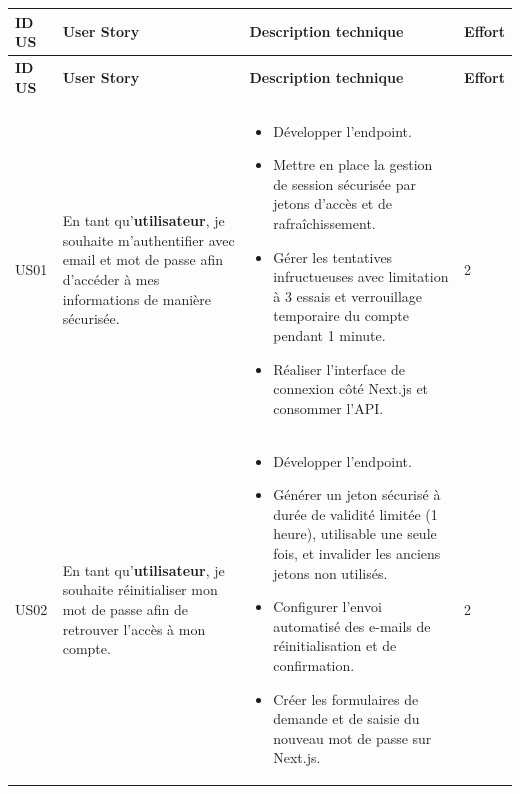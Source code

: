 ﻿
\renewcommand{\arraystretch}{1.3}
\setlength{\extrarowheight}{3pt}
\small
\sloppy
\begin{longtable}{|C{1cm}|L{5.6cm}|L{8cm}|C{0.85cm}|}
\hline
\textbf{ID US} & \textbf{User Story} & \textbf{Description technique} & \textbf{Effort} \\
\hline
\endfirsthead

\hline
\textbf{ID US} & \textbf{User Story} & \textbf{Description technique} & \textbf{Effort} \\
\hline
\endhead

\hline
\endfoot

\hline
\endlastfoot

 \\
\hline

US01 & En tant qu'\textbf{utilisateur}, je souhaite m'authentifier avec email et mot de passe afin d'accéder à mes informations de manière sécurisée. &
\begin{itemize}[nosep, left=0pt, label={$\bullet$}]
\item Développer l'endpoint.
\item Mettre en place la gestion de session sécurisée par jetons d'accès et de rafraîchissement.
\item Gérer les tentatives infructueuses avec limitation à 3 essais et verrouillage temporaire du compte pendant 1 minute.
\item Réaliser l'interface de connexion côté Next.js et consommer l'API.
\end{itemize} & 2 \\
\hline

US02 & En tant qu'\textbf{utilisateur}, je souhaite réinitialiser mon mot de passe afin de retrouver l'accès à mon compte. &
\begin{itemize}[nosep, left=0pt, label={$\bullet$}]
\item Développer l'endpoint.
\item Générer un jeton sécurisé à durée de validité limitée (1 heure), utilisable une seule fois, et invalider les anciens jetons non utilisés.
\item Configurer l'envoi automatisé des e-mails de réinitialisation et de confirmation.
\item Créer les formulaires de demande et de saisie du nouveau mot de passe sur Next.js.
\end{itemize} & 2 \\
\hline


\end{longtable}
